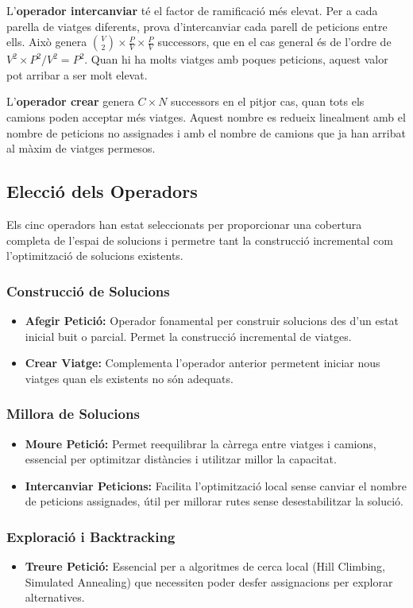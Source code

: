 \vspace{0.5em}
L'\textbf{operador intercanviar} té el factor de ramificació més elevat. Per a cada parella de viatges diferents, prova d'intercanviar cada parell de peticions entre ells. Això genera $\binom{V}{2} \times \frac{P}{V} \times \frac{P}{V}$ successors, que en el cas general és de l'ordre de $V^2 \times P^2 / V^2 = P^2$. Quan hi ha molts viatges amb poques peticions, aquest valor pot arribar a ser molt elevat.

\vspace{0.5em}
L'\textbf{operador crear} genera $C \times N$ successors en el pitjor cas, quan tots els camions poden acceptar més viatges. Aquest nombre es redueix linealment amb el nombre de peticions no assignades i amb el nombre de camions que ja han arribat al màxim de viatges permesos.
\subsection{Elecció dels Operadors}

Els cinc operadors han estat seleccionats per proporcionar una cobertura completa de l'espai de solucions i permetre tant la construcció incremental com l'optimització de solucions existents.

\subsubsection{Construcció de Solucions}
\begin{itemize}
    \item \textbf{Afegir Petició:} Operador fonamental per construir solucions des d'un estat inicial buit o parcial. Permet la construcció incremental de viatges.
    \item \textbf{Crear Viatge:} Complementa l'operador anterior permetent iniciar nous viatges quan els existents no són adequats.
\end{itemize}

\subsubsection{Millora de Solucions}
\begin{itemize}
    \item \textbf{Moure Petició:} Permet reequilibrar la càrrega entre viatges i camions, essencial per optimitzar distàncies i utilitzar millor la capacitat.
    \item \textbf{Intercanviar Peticions:} Facilita l'optimització local sense canviar el nombre de peticions assignades, útil per millorar rutes sense desestabilitzar la solució.
\end{itemize}

\subsubsection{Exploració i Backtracking}
\begin{itemize}
    \item \textbf{Treure Petició:} Essencial per a algoritmes de cerca local (Hill Climbing, Simulated Annealing) que necessiten poder desfer assignacions per explorar alternatives.
\end{itemize}
